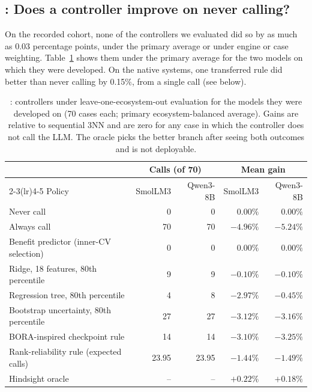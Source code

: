 \subsection{: Does a controller improve on never calling?}
\label{sec:rq4}

On the recorded cohort, none of the controllers we evaluated did so by as much as 0.03 percentage points, under the primary average or under engine or case weighting. Table~\ref{tab:rq4} shows them under the primary average for the two models on which they were developed. On the native systems, one transferred rule did better than never calling by 0.15\%, from a single call (see below).

\begin{table}[t]
\centering
\caption{: controllers under leave-one-ecosystem-out evaluation for the models they were developed on (70 cases each; primary ecosystem-balanced average). Gains are relative to sequential 3NN and are zero for any case in which the controller does not call the LLM. The oracle picks the better branch after seeing both outcomes and is not deployable.}
\label{tab:rq4}
\small
\begin{tabular}{lrrrr}
\toprule
 & \multicolumn{2}{c}{Calls (of 70)} & \multicolumn{2}{c}{Mean gain} \\
\cmidrule(lr){2-3}\cmidrule(lr){4-5}
Policy & SmolLM3 & Qwen3-8B & SmolLM3 & Qwen3-8B \\
\midrule
Never call & 0 & 0 & $0.00\%$ & $0.00\%$ \\
Always call & 70 & 70 & $-4.96\%$ & $-5.24\%$ \\
Benefit predictor (inner-CV selection) & 0 & 0 & $0.00\%$ & $0.00\%$ \\
Ridge, 18 features, 80th percentile & 9 & 9 & $-0.10\%$ & $-0.10\%$ \\
Regression tree, 80th percentile & 4 & 8 & $-2.97\%$ & $-0.45\%$ \\
Bootstrap uncertainty, 80th percentile & 27 & 27 & $-3.12\%$ & $-3.16\%$ \\
BORA-inspired checkpoint rule & 14 & 14 & $-3.10\%$ & $-3.25\%$ \\
Rank-reliability rule (expected calls) & 23.95 & 23.95 & $-1.44\%$ & $-1.49\%$ \\
\midrule
Hindsight oracle & -- & -- & $+0.22\%$ & $+0.18\%$ \\
\bottomrule
\end{tabular}
\end{table}


